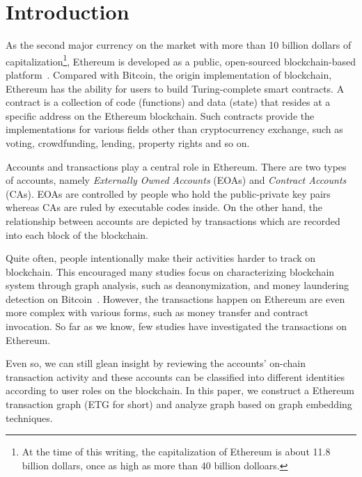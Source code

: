
\section{Introduction}

As the second major currency on the market with more than 10 billion dollars of capitalization\footnote{At the time of this writing, the capitalization of Ethereum is about 11.8 billion dollars, once as high as more than 40 billion dolloars.}, Ethereum is developed as a public, open-sourced blockchain-based platform~\cite{buterin2013ethereum}. Compared with Bitcoin, the origin implementation of blockchain, Ethereum has the ability for users to build Turing-complete smart contracts. A contract is a collection of code (functions) and data (state) that resides at a specific address on the Ethereum blockchain. Such contracts provide the implementations for various fields other than cryptocurrency exchange, such as voting, crowdfunding, lending, property rights and so on.

Accounts and transactions play a central role in Ethereum. There are two types of accounts, namely \emph{Externally Owned Accounts} (EOAs) and \emph{Contract Accounts} (CAs). EOAs are controlled by people who hold the public-private key pairs whereas CAs are ruled by executable codes inside. On the other hand, the relationship between accounts are depicted by transactions which are recorded into each block of the blockchain.


 Quite often, people intentionally make their activities harder to track on blockchain. This encouraged many studies focus on characterizing blockchain system through graph analysis, such as deanonymization, and money laundering detection on Bitcoin~\cite{reid2013analysis,zhao2015graph,maesa2016analysis}. However, the transactions happen on Ethereum are even more complex with various forms, such as money transfer and contract invocation. So far as we know, few studies have investigated the transactions on Ethereum. 
 
 Even so, we can still glean insight by reviewing the accounts' on-chain transaction activity and these accounts can be classified into different identities according to user roles on the blockchain. In this paper, we construct a Ethereum transaction graph (ETG for short) and analyze graph based on graph embedding techniques. 
 
